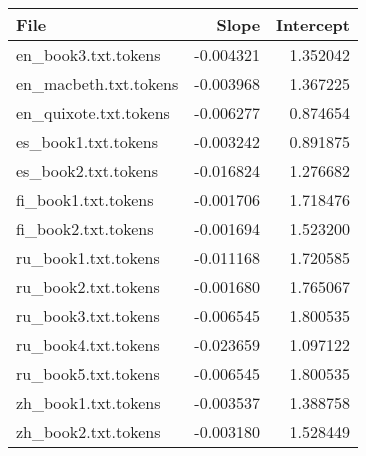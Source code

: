 \begin{tabular}{lrr}
\toprule
File & Slope & Intercept \\
\midrule
en_book3.txt.tokens & -0.004321 & 1.352042 \\
en_macbeth.txt.tokens & -0.003968 & 1.367225 \\
en_quixote.txt.tokens & -0.006277 & 0.874654 \\
es_book1.txt.tokens & -0.003242 & 0.891875 \\
es_book2.txt.tokens & -0.016824 & 1.276682 \\
fi_book1.txt.tokens & -0.001706 & 1.718476 \\
fi_book2.txt.tokens & -0.001694 & 1.523200 \\
ru_book1.txt.tokens & -0.011168 & 1.720585 \\
ru_book2.txt.tokens & -0.001680 & 1.765067 \\
ru_book3.txt.tokens & -0.006545 & 1.800535 \\
ru_book4.txt.tokens & -0.023659 & 1.097122 \\
ru_book5.txt.tokens & -0.006545 & 1.800535 \\
zh_book1.txt.tokens & -0.003537 & 1.388758 \\
zh_book2.txt.tokens & -0.003180 & 1.528449 \\
\bottomrule
\end{tabular}
